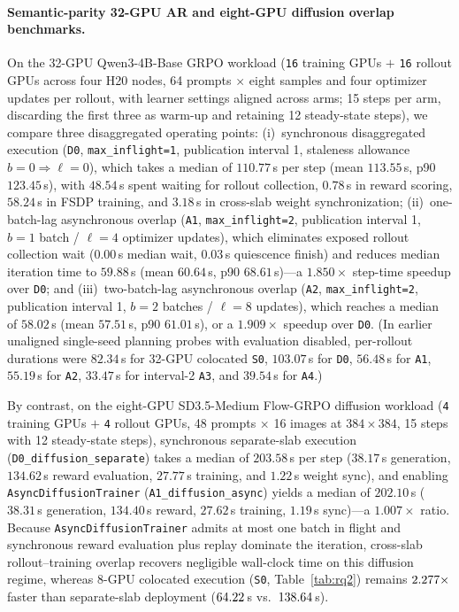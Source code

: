\documentclass[10pt]{article}
\begin{document}
\paragraph{Semantic-parity 32-GPU AR and eight-GPU diffusion overlap benchmarks.}
On the 32-GPU Qwen3-4B-Base GRPO workload (\texttt{16} training GPUs $+$ \texttt{16} rollout GPUs across four H20 nodes, 64 prompts $\times$ eight samples and four optimizer updates per rollout, with learner settings aligned across arms; 15 steps per arm, discarding the first three as warm-up and retaining 12 steady-state steps), we compare three disaggregated operating points:
(i)~synchronous disaggregated execution (\texttt{D0}, \texttt{max\_inflight=1}, publication interval 1, staleness allowance $b=0 \Rightarrow \ell=0$), which takes a median of $110.77$\,s per step (mean $113.55$\,s, p90 $123.45$\,s), with $48.54$\,s spent waiting for rollout collection, $0.78$\,s in reward scoring, $58.24$\,s in FSDP training, and $3.18$\,s in cross-slab weight synchronization;
(ii)~one-batch-lag asynchronous overlap (\texttt{A1}, \texttt{max\_inflight=2}, publication interval 1, $b=1$ batch / $\ell=4$ optimizer updates), which eliminates exposed rollout collection wait ($0.00$\,s median wait, $0.03$\,s quiescence finish) and reduces median iteration time to $59.88$\,s (mean $60.64$\,s, p90 $68.61$\,s)---a $1.850\times$ step-time speedup over \texttt{D0}; and
(iii)~two-batch-lag asynchronous overlap (\texttt{A2}, \texttt{max\_inflight=2}, publication interval 1, $b=2$ batches / $\ell=8$ updates), which reaches a median of $58.02$\,s (mean $57.51$\,s, p90 $61.01$\,s), or a $1.909\times$ speedup over \texttt{D0}.
(In earlier unaligned single-seed planning probes with evaluation disabled, per-rollout durations were $82.34$\,s for 32-GPU colocated \texttt{S0}, $103.07$\,s for \texttt{D0}, $56.48$\,s for \texttt{A1}, $55.19$\,s for \texttt{A2}, $33.47$\,s for interval-2 \texttt{A3}, and $39.54$\,s for \texttt{A4}.)

By contrast, on the eight-GPU SD3.5-Medium Flow-GRPO diffusion workload (\texttt{4} training GPUs $+$ \texttt{4} rollout GPUs, 48 prompts $\times$ 16 images at $384\times384$, 15 steps with 12 steady-state steps), synchronous separate-slab execution (\texttt{D0\_diffusion\_separate}) takes a median of $203.58$\,s per step ($38.17$\,s generation, $134.62$\,s reward evaluation, $27.77$\,s training, and $1.22$\,s weight sync), and enabling \texttt{AsyncDiffusionTrainer} (\texttt{A1\_diffusion\_async}) yields a median of $202.10$\,s ($38.31$\,s generation, $134.40$\,s reward, $27.62$\,s training, $1.19$\,s sync)---a $1.007\times$ ratio.
Because \texttt{AsyncDiffusionTrainer} admits at most one batch in flight and synchronous reward evaluation plus replay dominate the iteration, cross-slab rollout--training overlap recovers negligible wall-clock time on this diffusion regime, whereas 8-GPU colocated execution (\texttt{S0}, Table~\ref{tab:rq2}) remains $2.277{}\times$ faster than separate-slab deployment ($64.22{}$\,s vs.\ $138.64{}$\,s).
\end{document}
